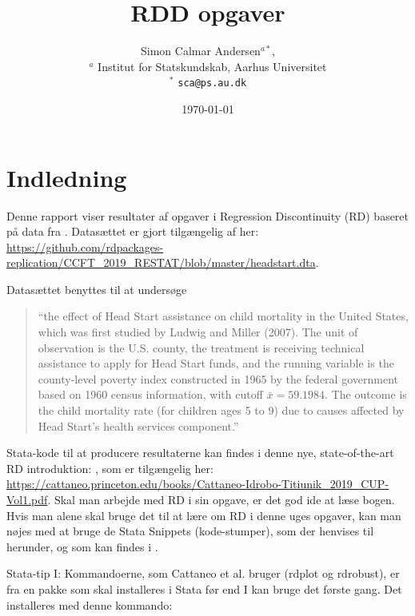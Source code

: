 \documentclass[12pt]{article}
\title{RDD opgaver }
\author{Simon Calmar Andersen$^{a*}$,  \\
        \small $^{a}$ Institut for Statskundskab, Aarhus Universitet \\
        \small $^{*}$ \tt{sca@ps.au.dk}}
\date{\today} %
\begin{document}
\doublespacing

\maketitle




\section*{Indledning}
Denne rapport viser resultater af opgaver i Regression Discontinuity (RD) baseret på data fra \autocite{ludwig_does_2007}. Datasættet er gjort tilgængelig af \autocite{calonico_regression_2018} her: \url{https://github.com/rdpackages-replication/CCFT_2019_RESTAT/blob/master/headstart.dta}.

Datasættet benyttes til at undersøge
	\begin{quote}
	``the effect of Head Start assistance on child mortality in the United States, which was first studied by Ludwig and Miller (2007). The unit of observation is the U.S. county, the treatment is receiving technical assistance to apply for Head Start funds, and the running variable is the county-level poverty index constructed in 1965 by the federal government based on 1960 census information, with cutoff $\bar{x} =59.1984$. The outcome is the child mortality rate (for children ages 5 to 9) due to causes affected by Head Start's health services component.'' \autocite{calonico_regression_2018}
	\end{quote}


Stata-kode til at producere resultaterne kan findes i denne nye, state-of-the-art RD introduktion:
\textcite{cattaneo_practical_2020}, som er tilgængelig her: \url{https://cattaneo.princeton.edu/books/Cattaneo-Idrobo-Titiunik_2019_CUP-Vol1.pdf}. Skal man arbejde med RD i sin opgave, er det god ide at læse bogen. Hvis man alene skal bruge det til at lære om RD i denne uges opgaver, kan man nøjes med at bruge de Stata Snippets (kode-stumper), som der henvises til herunder, og som kan findes i \textcite{cattaneo_practical_2020}.

Stata-tip I: Kommandoerne, som Cattaneo et al. bruger (rdplot og rdrobust), er fra en pakke som skal installeres i Stata før end I kan bruge det første gang. Det installeres med denne kommando:
\end{document}
